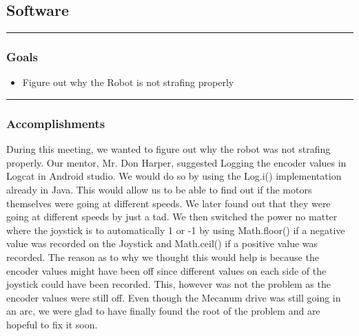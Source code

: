 \subsection*{Software}
\noindent\hfil\rule{\textwidth}{.4pt}\hfil
\subsubsection*{Goals}
\begin{itemize}
    \item Figure out why the Robot is not strafing properly

\end{itemize} 

\noindent\hfil\rule{\textwidth}{.4pt}\hfil

\subsubsection*{Accomplishments}
During this meeting, we wanted to figure out why the robot was not strafing properly. Our mentor, Mr. Don Harper, suggested Logging the encoder values in Logcat in Android studio. We would do so by using the Log.i() implementation already in Java. This would allow us to be able to find out if the motors themselves were going at different speeds. We later found out that they were going at different speeds by just a tad. We then switched the power no matter where the joystick is to automatically 1 or -1 by using Math.floor() if a negative value was recorded on the Joystick and Math.ceil() if a positive value was recorded. The reason as to why we thought this would help is because the encoder values might have been off since different values on each side of the joystick could have been recorded. This, however was not the problem as the encoder values were still off. Even though the Mecanum drive was still going in an arc, we were glad to have finally found the root of the problem and are hopeful to fix it soon.





